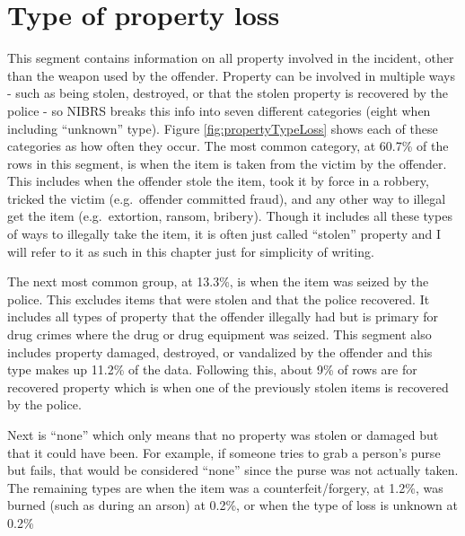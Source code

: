 \documentclass[
]{krantz}
\begin{document}
\section{Type of property loss}\label{propertyLoss}

This segment contains information on all property involved
in the incident, other than the weapon used by the offender.
Property can be involved in multiple ways - such as being
stolen, destroyed, or that the stolen property is recovered
by the police - so NIBRS breaks this info into seven
different categories (eight when including ``unknown''
type). Figure \ref{fig:propertyTypeLoss} shows each of these
categories as how often they occur. The most common
category, at 60.7\% of the rows in this segment, is when the
item is taken from the victim by the offender. This includes
when the offender stole the item, took it by force in a
robbery, tricked the victim (e.g.~offender committed fraud),
and any other way to illegal get the item (e.g.~extortion,
ransom, bribery). Though it includes all these types of ways
to illegally take the item, it is often just called
``stolen'' property and I will refer to it as such in this
chapter just for simplicity of writing.

The next most common group, at 13.3\%, is when the item was
seized by the police. This excludes items that were stolen
and that the police recovered. It includes all types of
property that the offender illegally had but is primary for
drug crimes where the drug or drug equipment was seized.
This segment also includes property damaged, destroyed, or
vandalized by the offender and this type makes up 11.2\% of
the data. Following this, about 9\% of rows are for
recovered property which is when one of the previously
stolen items is recovered by the police.

Next is ``none'' which only means that no property was
stolen or damaged but that it could have been. For example,
if someone tries to grab a person's purse but fails, that
would be considered ``none'' since the purse was not
actually taken. The remaining types are when the item was a
counterfeit/forgery, at 1.2\%, was burned (such as during an
arson) at 0.2\%, or when the type of loss is unknown at
0.2\%
\end{document}
